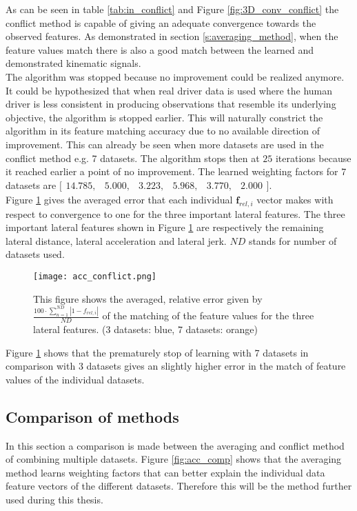 As can be seen in table \ref{tab:in_conflict} and Figure \ref{fig:3D_conv_conflict} the conflict method is capable of giving an adequate convergence towards the observed features. As demonstrated in section \ref{s:averaging_method}, when the feature values match there is also a good match between the learned and demonstrated kinematic signals.\\

The algorithm was stopped because no improvement could be realized anymore. It could be hypothesized that when real driver data is used where the human driver is less consistent in producing observations that resemble its underlying objective, the algorithm is stopped earlier. This will naturally constrict the algorithm in its feature matching accuracy due to no available direction of improvement. This can already be seen when more datasets are used in the conflict method e.g. 7 datasets. The algorithm stops then at $25$ iterations because it reached earlier a point of no improvement. The learned weighting factors for 7 datasets are $\bigl[ \begin{smallmatrix} 14.785,&5.000,&3.223,&5.968,&3.770,&2.000\end{smallmatrix}\bigr]$. \\
Figure \ref{fig:acc_conflict} gives the averaged error that each individual $\bm{f}_{rel,i}$ vector makes with respect to convergence to one for the three important lateral features. The three important lateral features shown in Figure \ref{fig:acc_conflict} are respectively the remaining lateral distance, lateral acceleration and lateral jerk. $ND$ stands for number of datasets used.

\begin{figure}[h!]
	\centering
	\texttt{[image: acc\_conflict.png]}
	\caption{This figure shows the averaged, relative error given by $\frac{100\cdot\sum_{n=1}^{ND}|1-f_{rel,i}|}{ND}$ of the matching of the feature values for the three lateral features. (3 datasets: blue, 7 datasets: orange)}
	\label{fig:acc_conflict}
\end{figure}

Figure \ref{fig:acc_conflict} shows that the prematurely stop of learning with 7 datasets in comparison with 3 datasets gives an slightly higher error in the match of feature values of the individual datasets.    
 
\subsection{Comparison of methods}\label{s:comparison of methods}
In this section a comparison is made between the averaging and conflict method of combining multiple datasets. Figure \ref{fig:acc_comp} shows that the averaging method learns weighting factors that can better explain the individual data feature vectors of the different datasets. Therefore this will be the method further used during this thesis.

